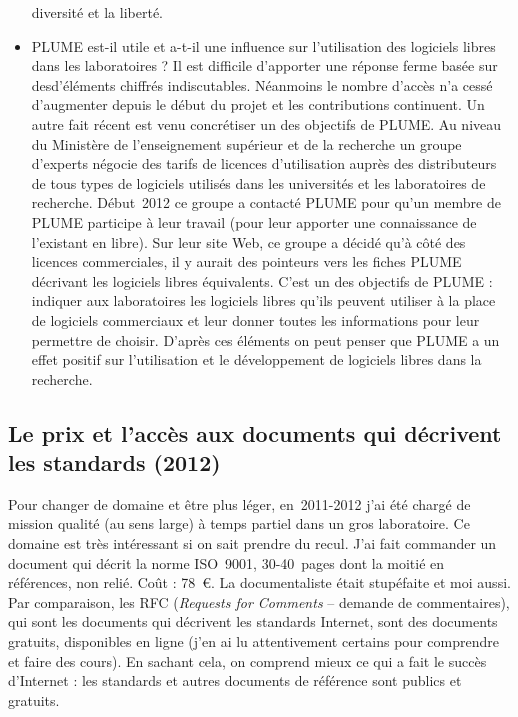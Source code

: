 \documentclass{FramateX}
\begin{document}
\begin{refsection}
\begin{itemize}
diversité et la liberté.
\item PLUME est-il utile et a-t-il une influence sur l'utilisation des
logiciels libres dans les laboratoires ? Il est difficile d'apporter
une réponse ferme basée sur desd'éléments chiffrés indiscutables.
Néanmoins le nombre d'accès n'a cessé d'augmenter depuis le début du
projet et les contributions continuent. Un autre fait récent est venu
concrétiser un des objectifs de PLUME. Au niveau du Ministère de
l'enseignement supérieur et de la recherche un groupe d'experts négocie
des tarifs de licences d'utilisation auprès des distributeurs de tous
types de logiciels utilisés dans les universités et les laboratoires de
recherche. Début~2012 ce groupe a contacté PLUME pour qu'un membre de
PLUME participe à leur travail (pour leur apporter une connaissance de
l'existant en libre). Sur leur site Web, ce groupe a décidé qu'à côté
des licences commerciales, il y aurait des pointeurs vers les fiches
PLUME décrivant les logiciels libres équivalents. C'est un des objectifs
de PLUME : indiquer aux laboratoires les logiciels libres qu'ils
peuvent utiliser à la place de logiciels commerciaux et leur donner
toutes les informations pour leur permettre de choisir. D'après ces
éléments on peut penser que PLUME a un effet positif sur l'utilisation
et le développement de logiciels libres dans la recherche.
\end{itemize}

\subsection*{Le prix et l'accès aux documents qui décrivent les standards (2012)}
{}



Pour changer de domaine et être plus léger, en~2011-2012 j'ai été chargé
de mission qualité (au sens large) à temps partiel dans un gros
laboratoire. Ce domaine est très intéressant si on sait prendre du
recul. J'ai fait commander un document qui décrit la norme ISO~9001,
30-40~pages dont la moitié en références, non relié. Coût : 78~€. La
documentaliste était stupéfaite et moi aussi. Par comparaison, les RFC
(\textit{Requests for Comments} – demande de commentaires), qui sont
les documents qui décrivent les standards Internet, sont des documents
gratuits, disponibles en ligne (j'en ai lu attentivement certains pour
comprendre et faire des cours). En sachant cela, on comprend mieux ce
qui a fait le succès d'Internet : les standards et autres documents de
référence sont publics et gratuits.



\end{refsection}
\end{document}
